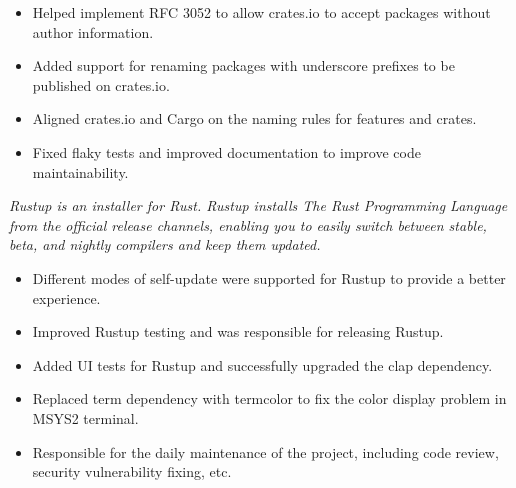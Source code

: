 \documentclass{software_engineer_rustin_liu}
\newcommand{\en}[1]{#1}
\newcommand{\zh}[1]{}
\begin{document}
\begin{itemize}
      \item \en{Helped implement RFC 3052 to allow crates.io to accept packages without author information.}
            \zh{帮助实现 RFC 3052，让 crates.io 开始接受无作者信息的包。}
      \item \en{Added support for renaming packages with underscore prefixes to be published on crates.io.}
            \zh{支持下划线前缀的重命名包在 crates.io 的发布。}
      \item \en{Aligned crates.io and Cargo on the naming rules for features and crates.}
            \zh{对齐了 crates.io 和 Cargo 对 feature 和 crate 的名称校验规则。}
      \item \en{Fixed flaky tests and improved documentation to improve code maintainability.}
            \zh{修复不稳定测试，完善文档，提升代码可维护性。}
\end{itemize}


\en{}
\zh{\datedsubsection{\textbf{Rustup(Rust) - 前维护者}}{{\href{https://github.com/rust-lang/rustup/commits?author=hi-rustin}{110+ commits}}}}
\en{\textsl{Rustup is an installer for Rust. Rustup installs The Rust Programming Language from the official release channels, enabling you to easily switch between stable, beta, and nightly compilers and keep them updated.}}
\zh{\textsl{Rustup 是 Rust 的安装器。Rustup 从官方发布渠道安装 Rust 编程语言，使用户可以轻松地在稳定版、测试版和夜版编译器之间切换并保持更新。}}

\begin{itemize}
      \item \en{Different modes of self-update were supported for Rustup to provide a better experience.}
            \zh{为 Rustup 支持了 self-update 的不同模式来提供更好的使用体验。}
      \item \en{Improved Rustup testing and was responsible for releasing Rustup.}
            \zh{改善 Rustup 测试，负责发布 Rustup。}
      \item \en{Added UI tests for Rustup and successfully upgraded the clap dependency.}
            \zh{为 Rustup 添加了 UI 测试，顺利升级了 clap 依赖。}
      \item \en{Replaced term dependency with termcolor to fix the color display problem in MSYS2 terminal.}
            \zh{将 term 依赖替换为 termcolor，修复了 MSYS2 终端下颜色显示的问题。}
      \item \en{Responsible for the daily maintenance of the project, including code review, security vulnerability fixing, etc.}
            \zh{负责项目日常维护，包括代码审查、依赖升级、安全漏洞修复等。}
\end{itemize}
\end{document}

